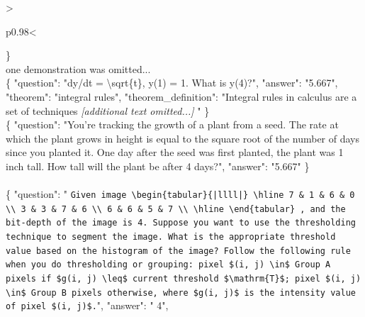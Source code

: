 \begin{table}[!th]
\begin{tabular}{>{\raggedright\arraybackslash\tt}p{}<{}}
            \}
            \\
            one demonstration was omitted...
            \\
            \{
                "question": "dy/dt = \textbackslash sqrt\{t\}, y(1) = 1. What is y(4)?",
                "answer": "5.667",
                "theorem": "integral rules",
                "theorem\_definition": "Integral rules in calculus are a set of techniques \textit{[additional text omitted...]} "
            \}
            \\
            \{
                "question": "You're tracking the growth of a plant from a seed. The rate at which the plant grows in height is equal to the square root of the number of days since you planted it. One day after the seed was first planted, the plant was 1 inch tall. How tall will the plant be after 4 days?",
                "answer": "5.667"
            \}
            \\\\
            \{
                "question": "{\color{blue} \lstinline!Given image \begin{tabular}{|llll|} \hline 7 & 1 & 6 & 0 \\ 3 & 3 & 7 & 6 \\ 6 & 6 & 5 & 7 \\ \hline \end{tabular} , and the bit-depth of the image is 4. Suppose you want to use the thresholding technique to segment the image. What is the appropriate threshold value based on the histogram of the image? Follow the following rule when you do thresholding or grouping: pixel $(i, j) \in$ Group A pixels if $g(i, j) \leq$ current threshold $\mathrm{T}$; pixel $(i, j) \in$ Group B pixels otherwise, where $g(i, j)$ is the intensity value of pixel $(i, j)$.!}",
                "answer": "{\color{blue} 4}",

\end{tabular}
\end{table}
